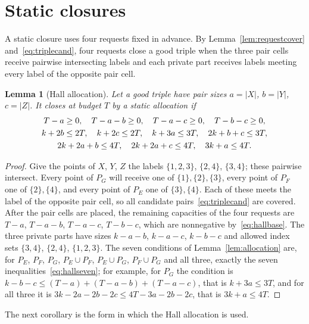 \documentclass[11pt]{article}
\numberwithin{equation}{section}
\newtheorem{lemma}[theorem]{Lemma}
\theoremstyle{definition}
\theoremstyle{remark}
\begin{document}
\section{Static closures}\label{sec:static}

A static closure uses four requests fixed in advance. By
Lemma~\ref{lem:requestcover} and~\eqref{eq:triplecand}, four requests
close a good triple when the three pair cells receive pairwise
intersecting labels and each private part receives labels meeting every
label of the opposite pair cell.

\begin{lemma}[Hall allocation]\label{lem:hall}
Let a good triple have pair sizes $a=|X|$, $b=|Y|$, $c=|Z|$. It closes at
budget $T$ by a static allocation if
\begin{gather}
 T-a\ge0,\quad T-a-b\ge0,\quad T-a-c\ge0,\quad T-b-c\ge0,\label{eq:hallbase}\\
 k+2b\le2T,\quad k+2c\le2T,\quad k+3a\le3T,\quad 2k+b+c\le3T,\label{eq:hallseven}\\
 2k+2a+b\le4T,\quad 2k+2a+c\le4T,\quad 3k+a\le4T.\notag
\end{gather}
\end{lemma}
\begin{proof}
Give the points of $X$, $Y$, $Z$ the labels $\{1,2,3\}$, $\{2,4\}$,
$\{3,4\}$; these pairwise intersect. Every point of $P_G$ will receive
one of $\{1\},\{2\},\{3\}$, every point of $P_F$ one of $\{2\},\{4\}$,
and every point of $P_E$ one of $\{3\},\{4\}$. Each of these meets the
label of the opposite pair cell, so all candidate
pairs~\eqref{eq:triplecand} are covered. After the pair cells are placed,
the remaining capacities of the four requests are $T-a$, $T-a-b$,
$T-a-c$, $T-b-c$, which are nonnegative by~\eqref{eq:hallbase}. The
three private parts have sizes $k-a-b$, $k-a-c$, $k-b-c$ and allowed
index sets $\{3,4\}$, $\{2,4\}$, $\{1,2,3\}$. The seven conditions of
Lemma~\ref{lem:allocation} are, for $P_E$, $P_F$, $P_G$, $P_E\cup P_F$,
$P_E\cup P_G$, $P_F\cup P_G$ and all three, exactly the seven
inequalities~\eqref{eq:hallseven}; for example, for $P_G$ the condition
is $k-b-c\le(T-a)+(T-a-b)+(T-a-c)$, that is $k+3a\le3T$, and for all
three it is $3k-2a-2b-2c\le4T-3a-2b-2c$, that is $3k+a\le4T$.
\end{proof}

The next corollary is the form in which the Hall allocation is used.
\end{document}
